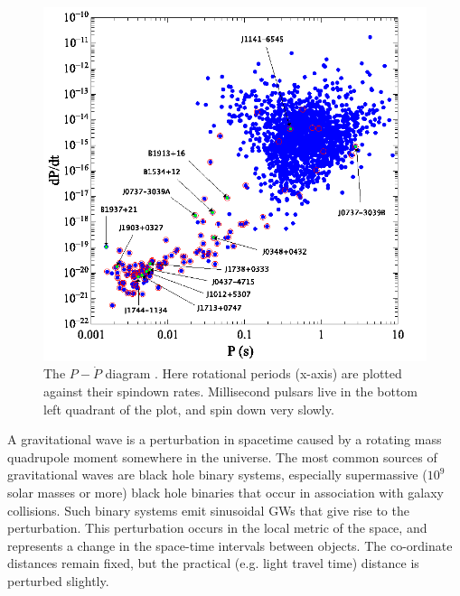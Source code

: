 \documentclass[12pt]{article}
\begin{document}
\begin{figure}
    \caption{The $P-\dot{P}$ diagram \cite{Lorimer2008}. Here rotational periods (x-axis) are
plotted against their spindown rates. Millisecond pulsars live in the bottom
left quadrant of the plot, and spin down very slowly.}
\includegraphics[width=\textwidth]{./figures/fig_P_Pdot_with_names.png}
\end{figure}


A gravitational wave is a perturbation in spacetime caused by a rotating
mass quadrupole moment somewhere in the universe. The most common sources of gravitational
waves are black hole binary systems, especially supermassive ($10^9$ solar
masses or more) black hole binaries
that occur in association with galaxy collisions. Such binary systems emit sinusoidal
GWs that give rise to the perturbation.
This perturbation occurs in the local metric of the space, and represents a
change in the space-time intervals between objects. The co-ordinate distances
remain fixed, but the practical (e.g. light travel time) distance is perturbed
slightly.
\end{document}
